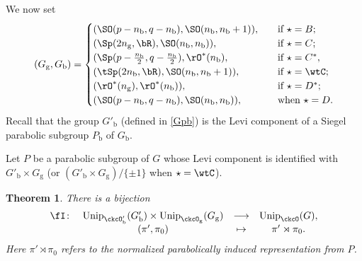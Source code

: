 \documentclass[12pt,a4paper]{amsart}
\numberwithin{equation}{section}
\newtheorem{thm}{Theorem}[section]
\theoremstyle{remark}
\def\Unip{\mathrm{Unip}}
\def\nnb{n_{\mathrm b}}
\begin{document}
We now set
\[
  (G_{\mathrm g},G_{\mathrm b}) =
  \begin{cases}
    (\SO(p-n_{\mathrm b},q-n_{\mathrm b}), \SO(\nnb,\nnb+1)), &\quad \text{if } \star = B; \\
    (\Sp(2n_{\mathrm g},\bR),\SO(\nnb,\nnb)), &\quad \text{if } \star = C; \\
    ( \Sp(p-\frac{n_{\mathrm b}}{2},q-\frac{n_{\mathrm b}}{2}), \rO^{*}(n_{\mathrm b}), &\quad \text{if
    } \star = C^{*}, \\
    (\tSp(2n_{\mathrm b},\bR),\SO(\nnb,\nnb+1)), &\quad \text{if
    } \star = \wtC; \\
    ( \rO^{*}(n_{\mathrm g}), \rO^{*}(n_{\mathrm b})), &\quad  \text{if } \star = D^{*}; \\
    ( \SO(p-n_{\mathrm b},q-n_{\mathrm b}), \SO(n_{\mathrm b},n_{\mathrm b}) ), & \quad \text{when
    } \star = D. \\
  \end{cases}
\]
Recall that the group $G'_{\mathrm b}$ (defined in \eqref{Gpb}) is the Levi
component of a Siegel parabolic subgroup $P_{\mathrm b}$ of $G_{\mathrm b}$.





Let $P$ be  a parabolic subgroup of $G$ whose Levi component is identified with $G'_{\mathrm b}\times G_{\mathrm g}$ (or $(G'_{\mathrm b}\times G_{\mathrm g})/\{\pm 1\}$ when $\star=\wtC$).
\begin{thm}\label{thm:red}
  There is a bijection
  \begin{equation*}%
      \begin{array}{rccc}
    \fI\colon &   \Unip_{\ckcO'_{\mathrm b}}(G'_{\mathrm b})\times \Unip_{\ckcO_{\mathrm g}}(G_{\mathrm g})&         \longrightarrow &\Unip_{\ckcO}(G), \\
     &   (\pi',\pi_{0}) & \mapsto & \pi'\rtimes \pi_{0}.
      \end{array}
    \end{equation*}
    Here $\pi'\rtimes \pi_{0}$ refers to the normalized parabolically  induced representation from $P$.
  \end{thm}
\end{document}
